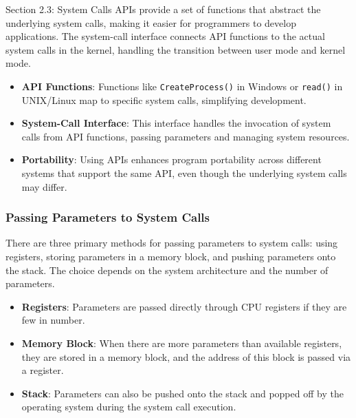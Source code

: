 \begin{notes}{Section 2.3: System Calls}
    APIs provide a set of functions that abstract the underlying system calls, making it easier for programmers to develop applications. The system-call interface connects API functions to the actual 
    system calls in the kernel, handling the transition between user mode and kernel mode.
    
    \begin{highlight}
    
    \begin{itemize}
        \item \textbf{API Functions}: Functions like \texttt{CreateProcess()} in Windows or \texttt{read()} in UNIX/Linux map to specific system calls, simplifying development.
        \item \textbf{System-Call Interface}: This interface handles the invocation of system calls from API functions, passing parameters and managing system resources.
        \item \textbf{Portability}: Using APIs enhances program portability across different systems that support the same API, even though the underlying system calls may differ.
    \end{itemize}
    
    \end{highlight}
    
    \subsubsection*{Passing Parameters to System Calls}
    
    There are three primary methods for passing parameters to system calls: using registers, storing parameters in a memory block, and pushing parameters onto the stack. The choice depends on the 
    system architecture and the number of parameters.
    
    \begin{highlight}
    
    \begin{itemize}
        \item \textbf{Registers}: Parameters are passed directly through CPU registers if they are few in number.
        \item \textbf{Memory Block}: When there are more parameters than available registers, they are stored in a memory block, and the address of this block is passed via a register.
        \item \textbf{Stack}: Parameters can also be pushed onto the stack and popped off by the operating system during the system call execution.
    \end{itemize}
    

\end{highlight}
\end{notes}
